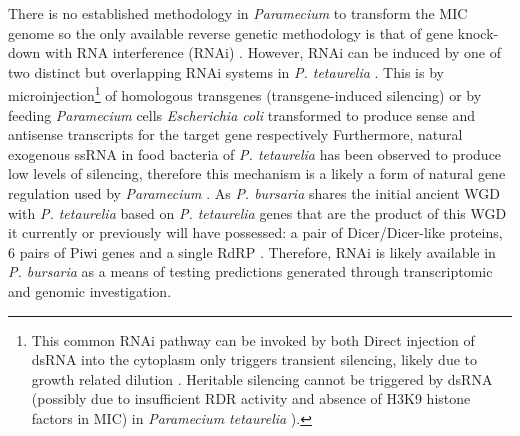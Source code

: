 There is no established methodology in \textit{Paramecium} to transform the MIC genome so the only available reverse genetic methodology is that of
gene knock-down with RNA interference (RNAi) \citep{Marker2014a}.  
However, RNAi can be induced by one of two distinct but overlapping RNAi systems in \textit{P. tetaurelia} \citep{Marker2014a}.
This is by microinjection\footnote{ This common RNAi pathway can be invoked by both Direct injection of dsRNA into the cytoplasm only triggers transient silencing, likely due to growth related dilution \citep{Galvani2002}.
Heritable silencing cannot be triggered by dsRNA (possibly due to insufficient RDR activity and absence of H3K9 histone factors in MIC) in \textit{Paramecium tetaurelia} \citep{Kiefer2013}).}
of homologous transgenes (transgene-induced silencing) or by feeding \textit{Paramecium} cells
\textit{Escherichia coli} transformed to produce sense and antisense transcripts for the target gene respectively \citep{Galvani2002}
Furthermore, natural exogenous ssRNA in food bacteria of \textit{P. tetaurelia} has been observed to produce low levels of silencing, therefore this mechanism
is a likely a form of natural gene regulation used by \textit{Paramecium} \citep{Carradec2015}.
As \textit{P. bursaria} shares the initial ancient WGD with \textit{P. tetaurelia} \citep{Aury2006} based on \textit{P. tetaurelia} genes that are the 
product of this WGD it currently or previously will have possessed: a pair of Dicer/Dicer-like proteins, 6 pairs of Piwi genes and a single RdRP \citep{Marker2014a}.
Therefore, RNAi is likely available in \textit{P. bursaria} as a means of testing predictions generated through transcriptomic and genomic investigation.


